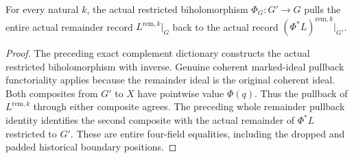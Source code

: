 \begin{theorem}
\label{hir:zero-contact-tail-initial-record}
\leanok
{}
For every natural $k$, the actual restricted biholomorphism
$\Phi_G:G'\to G$ pulls the entire actual remainder record
$L^{\mathrm{rem},k}|_G$ back to the actual record
$(\Phi^*L)^{\mathrm{rem},k}|_{G'}$.
\end{theorem}
\begin{proof}
The preceding exact complement dictionary constructs the actual restricted
biholomorphism with inverse. Genuine coherent marked-ideal pullback
functoriality applies because the remainder ideal is the original coherent
ideal. Both composites from $G'$ to $X$ have pointwise value $\Phi(q)$.
Thus the pullback of $L^{\mathrm{rem},k}$ through either composite agrees.
The preceding whole remainder pullback identity identifies the second
composite with the actual remainder of $\Phi^*L$ restricted to $G'$.
These are entire four-field equalities, including the dropped and padded
historical boundary positions.
\end{proof}

